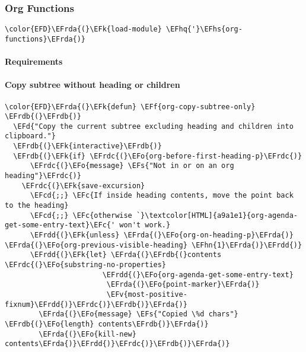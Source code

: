 \documentclass[a4wide,10pt]{article}
\newcommand{\EFc}[1]{\textcolor{EFc}{#1}} %
\newcommand{\EFcd}[1]{\textcolor{EFcd}{#1}} %
\newcommand{\EFs}[1]{\textcolor{EFs}{#1}} %
\newcommand{\EFd}[1]{\textcolor{EFd}{#1}} %
\newcommand{\EFk}[1]{\textcolor{EFk}{#1}} %
\newcommand{\EFf}[1]{\textcolor{EFf}{#1}} %
\newcommand{\EFv}[1]{\textcolor{EFv}{#1}} %
\newcommand{\EFo}[1]{\textcolor{EFo}{#1}} %
\newcommand{\EFhn}[1]{\textcolor{EFhn}{\textbf{#1}}} %
\newcommand{\EFhq}[1]{\textcolor{EFhq}{#1}} %
\newcommand{\EFhs}[1]{\textcolor{EFhs}{#1}} %
\newcommand{\EFrda}[1]{\textcolor{EFrda}{#1}} %
\newcommand{\EFrdb}[1]{\textcolor{EFrdb}{#1}} %
\newcommand{\EFrdc}[1]{\textcolor{EFrdc}{#1}} %
\newcommand{\EFrdd}[1]{\textcolor{EFrdd}{#1}} %
\begin{document}
\subsubsection{Org Functions}
\label{sec:orga93c175}
\begin{Code}
\begin{Verbatim}
\color{EFD}\EFrda{(}\EFk{load-module} \EFhq{'}\EFhs{org-functions}\EFrda{)}
\end{Verbatim}
\end{Code}
\paragraph{Requirements}
\label{sec:orge45737b}
\paragraph{Copy subtree without heading or children}
\label{sec:org9f0ea91}
\begin{Code}
\begin{Verbatim}
\color{EFD}\EFrda{(}\EFk{defun} \EFf{org-copy-subtree-only} \EFrdb{(}\EFrdb{)}
  \EFd{"Copy the current subtree excluding heading and children into clipboard."}
  \EFrdb{(}\EFk{interactive}\EFrdb{)}
  \EFrdb{(}\EFk{if} \EFrdc{(}\EFo{org-before-first-heading-p}\EFrdc{)}
      \EFrdc{(}\EFo{message} \EFs{"Not in or on an org heading"}\EFrdc{)}
    \EFrdc{(}\EFk{save-excursion}
      \EFcd{;;} \EFc{If inside heading contents, move the point back to the heading}
      \EFcd{;;} \EFc{otherwise `}\textcolor[HTML]{a9a1e1}{org-agenda-get-some-entry-text}\EFc{' won't work.}
      \EFrdd{(}\EFk{unless} \EFrda{(}\EFo{org-on-heading-p}\EFrda{)} \EFrda{(}\EFo{org-previous-visible-heading} \EFhn{1}\EFrda{)}\EFrdd{)}
      \EFrdd{(}\EFk{let} \EFrda{(}\EFrdb{(}contents \EFrdc{(}\EFo{substring-no-properties}
                       \EFrdd{(}\EFo{org-agenda-get-some-entry-text}
                        \EFrda{(}\EFo{point-marker}\EFrda{)}
                        \EFv{most-positive-fixnum}\EFrdd{)}\EFrdc{)}\EFrdb{)}\EFrda{)}
        \EFrda{(}\EFo{message} \EFs{"Copied \%d chars"} \EFrdb{(}\EFo{length} contents\EFrdb{)}\EFrda{)}
        \EFrda{(}\EFo{kill-new} contents\EFrda{)}\EFrdd{)}\EFrdc{)}\EFrdb{)}\EFrda{)}
\end{Verbatim}
\end{Code}
\end{document}
